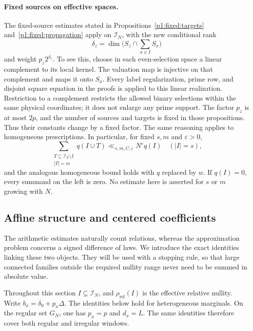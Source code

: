 \paragraph{Fixed sources on effective spaces.}
The fixed-source estimates stated in
Propositions~\ref{p1:fixed:targets} and~\ref{p1:fixed:propagation}
apply on
\(\mathcal I_N\), with the new conditional rank
\[
 \delta_z=\dim\bigl(S_z\cap\textstyle\sum_{x\in I}S_x\bigr)
\]
and weight \(p_z2^{\delta_z}\). To see this, choose in each
even-selection space a linear complement to its local kernel.
The valuation map is injective on that complement and maps it
onto \(S_x\). Every label regularization, prime row, and disjoint
square equation in the proofs is applied to this linear
realization. Restriction to a complement restricts the allowed
binary selections within the same physical coordinates; it does
not enlarge any prime support.
The factor \(p_z\) is at most \(2p\), and the number of sources
and targets is fixed in those propositions. Thus their constants
change by a fixed factor. The same reasoning applies to
homogeneous prescriptions. In particular, for fixed \(s,m\) and
\(\varepsilon>0\),
\begin{equation}
 \sum_{\substack{T\subseteq\mathcal I_N\setminus I\\|T|=m}}
       q(I\cup T)\ll_{s,m,C,\varepsilon}N^\varepsilon q(I)
 \quad (|I|=s),
 \label{p13:exact:propagation}
\end{equation}
and the analogous homogeneous bound holds with \(q\) replaced
by \(w\). If \(q(I)=0\), every summand on the left is zero.
No estimate here is asserted for \(s\) or \(m\) growing with \(N\).

\subsection{Affine structure and centered coefficients}
\label{p1:alg:section}

The arithmetic estimates naturally count relations, whereas the
approximation problem concerns a signed difference of laws.
We introduce the exact identities linking these two objects.
They will be used with a stopping rule, so that large connected
families outside the required nullity range never need to be
summed in absolute value.

Throughout this section $I\subseteq\mathcal I_N$, and
$\rho_{\mathrm{rel}}(I)$ is the effective relative nullity.
Write $b_x=\delta_0+p_x\Delta$. The identities below hold for
heterogeneous marginals. On the regular set $G_N$, one has $p_x=p$ and $d_x=L$.
The same identities therefore cover both regular and irregular windows.

